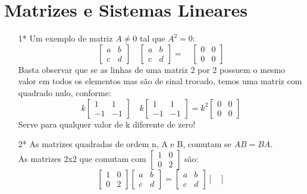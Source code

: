 \documentclass[a4paper]{article}
\begin{document}
\section*{Matrizes e Sistemas Lineares}

\begin{itemize}
\item[1*] Um exemplo de matriz $A \neq 0$ tal que $A^2=0$:
$$
\left[\begin{array}{rr}
a&b\\
c&d
\end{array}\right]
\quad
\left[\begin{array}{cc}
a&b\\
c&d
\end{array}\right]
=
\quad
\left[\begin{array}{cc}
0&0\\
0&0
\end{array}\right]
$$
\textcolor[rgb]{0,0,1}{Basta observar que se as linhas de uma matriz 2 por 2 possuem o mesmo valor em todos os elementos mas são de sinal trocado, temos uma matriz com quadrado nulo, conforme:
$$
k\left[\begin{array}{rr}
1&1\\
-1&-1
\end{array}\right]
\quad
k\left[\begin{array}{rr}
1&1\\
-1&-1
\end{array}\right]
=
k^2
\left[\begin{array}{cc}
0&0\\
0&0
\end{array}\right]
$$
Serve para qualquer valor de k diferente de zero!
}
\item[2*] As matrizes quadradas de ordem n, A e B, comutam se $AB = BA$. 
\\As matrizes 2x2 que comutam com $\left[\begin{array}{cc}
1&0\\0&2
\end{array}\right]$ são:
$$
\begin{bmatrix}
1&0\\0&2
\end{bmatrix}
\begin{bmatrix}
a&b\\c&d
\end{bmatrix}
=
\begin{bmatrix}
a&b\\c&d
\end{bmatrix}
\begin{bmatrix}

\end{bmatrix}$$
\end{itemize}
\end{document}
